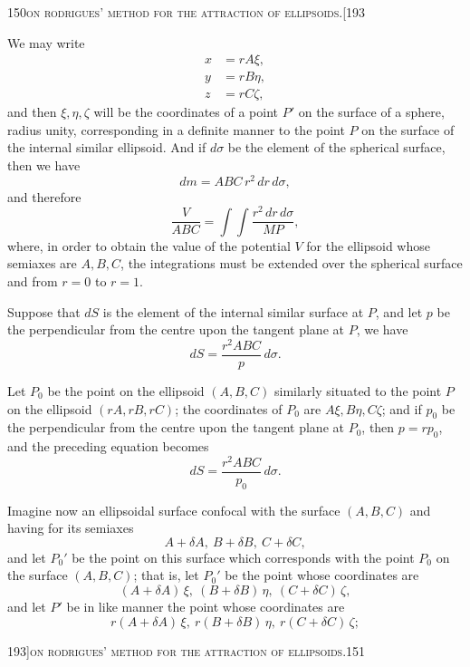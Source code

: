 \documentclass[11pt]{article}
\begin{document}
\bigskip

\begin{center}\small 150\hfill\textsc{on rodrigues' method for the attraction of ellipsoids.}\hfill [193\end{center}

\medskip

\noindent We may write
\begin{align*}
x &= rA\xi,\\
y &= rB\eta,\\
z &= rC\zeta,
\end{align*}
and then $\xi, \eta, \zeta$ will be the coordinates of a point $P'$ on the surface of a sphere, radius unity, corresponding in a definite manner to the point $P$ on the surface of the internal similar ellipsoid. And if $d\sigma$ be the element of the spherical surface, then we have
\[
dm = ABC\, r^{2}\, dr\, d\sigma,
\]
and therefore
\[
\frac{V}{ABC} = \int\!\!\int \frac{r^{2}\, dr\, d\sigma}{MP},
\]
where, in order to obtain the value of the potential $V$ for the ellipsoid whose semiaxes are $A, B, C$, the integrations must be extended over the spherical surface and from $r = 0$ to $r = 1$.

Suppose that $dS$ is the element of the internal similar surface at $P$, and let $p$ be the perpendicular from the centre upon the tangent plane at $P$, we have
\[
dS = \frac{r^{2} ABC}{p}\, d\sigma.
\]

Let $P_{0}$ be the point on the ellipsoid $(A, B, C)$ similarly situated to the point $P$ on the ellipsoid $(rA, rB, rC)$; the coordinates of $P_{0}$ are $A\xi, B\eta, C\zeta$; and if $p_{0}$ be the perpendicular from the centre upon the tangent plane at $P_{0}$, then $p = r p_{0}$, and the preceding equation becomes
\[
dS = \frac{r^{2} ABC}{p_{0}}\, d\sigma.
\]

Imagine now an ellipsoidal surface confocal with the surface $(A, B, C)$ and having for its semiaxes
\[
A + \delta A,\ B + \delta B,\ C + \delta C,
\]
and let $P_{0}'$ be the point on this surface which corresponds with the point $P_{0}$ on the surface $(A, B, C)$; that is, let $P_{0}'$ be the point whose coordinates are
\[
(A + \delta A)\, \xi,\ (B + \delta B)\, \eta,\ (C + \delta C)\, \zeta,
\]
and let $P'$ be in like manner the point whose coordinates are
\[
r(A + \delta A)\, \xi,\ r(B + \delta B)\, \eta,\ r(C + \delta C)\, \zeta;
\]

\bigskip

\begin{center}\small 193]\hfill\textsc{on rodrigues' method for the attraction of ellipsoids.}\hfill 151\end{center}
\end{document}
